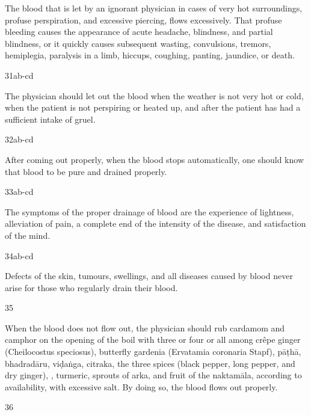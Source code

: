 \begin{translation}
The blood that is let by an ignorant physician in cases of very hot surroundings, profuse perspiration, and excessive piercing, flows excessively. That profuse bleeding causes the appearance of acute headache, blindness, and partial blindness, or it quickly causes subsequent wasting, convulsions, tremors, hemiplegia, paralysis in a limb, hiccups, coughing, panting, jaundice, or death.  

\item[31ab-cd]

The physician should let out the blood when the weather is not very hot or cold, when the patient is not perspiring or heated up, and after the patient has had a sufficient intake of gruel. 

\item[32ab-cd]

After coming out properly, when the blood stops automatically, one should know that blood to be pure and drained properly.

\item[33ab-cd]

The symptoms of the proper drainage of blood are the experience of lightness, alleviation of pain, a complete end of the intensity of the disease, and satisfaction of the mind.

\item[34ab-cd] 

Defects of the skin, tumours, swellings, and all diseases caused by blood never arise for those who regularly drain their blood.

\item[35]

	When the blood does not flow out, the physician should rub cardamom and camphor on the opening of the boil with three or four or all among crêpe ginger (Cheilocostus speciosus), butterfly gardenia (Ervatamia coronaria Stapf), \gls{pāṭhā}, \gls{bhadradāru}, \gls{viḍaṅga}, \gls{citraka}, the three spices (black pepper, long pepper, and dry ginger), , turmeric, sprouts of \gls{arka}, and fruit of the \gls{naktamāla}, according to availability, with excessive salt. By doing so, the blood flows out properly.

\item[36]


\end{translation}

